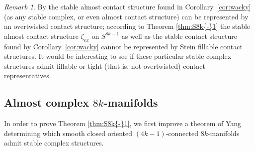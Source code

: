 \documentclass[12pt]{amsart}
\newcommand\Z{\mathbb{Z}}
\newcommand\pr{\textup{pr}}
\newcommand\scxs{\zeta}					%
\newcommand{\an}[1]{\langle{#1}{\rangle}}
\theoremstyle{remark}
\newtheorem{Remark}[Theorem]{Remark}
\begin{document}
\begin{Remark}
By \cite{BEM} the stable almost contact structure found in Corollary~\ref{cor:wacky} (as any stable complex, or even almost contact structure)
can be represented by 
an overtwisted contact structure; according to Theorem \ref{thm:S8k{-}1} the stable almost contact structure $\zeta _{ex}$ on 
$S^{8k-1}$ as well as the stable contact structure found by Corollary~\ref{cor:wacky} %
cannot be represented
by Stein fillable contact structures. It would be interesting to see if these particular stable complex structures
admit fillable or tight (that is, not overtwisted) contact representatives.
 \end{Remark}




\subsection{Almost complex $8k$-manifolds}
\label{subsec:AlmostComplex}
In order to prove Theorem \ref{thm:S8k{-}1}, we first improve a theorem
of Yang \cite{Yang12} determining which smooth closed oriented
$(4k{-}1)$-connected $8k$-manifolds admit stable complex structures.

\end{document}
